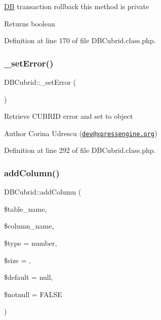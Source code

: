 \hyperlink{classDB}{DB} transaction rollback this method is private \begin{DoxyReturn}{Returns}
boolean 
\end{DoxyReturn}


Definition at line 170 of file D\+B\+Cubrid.\+class.\+php.

\mbox{\label{classDBCubrid_aaf7dd65f4cdfea9903ab641163058936}} 
\subsubsection{\texorpdfstring{\+\_\+set\+Error()}{\_setError()}}
{\footnotesize\ttfamily D\+B\+Cubrid\+::\+\_\+set\+Error (\begin{DoxyParamCaption}{ }\end{DoxyParamCaption})}

Retrieve C\+U\+B\+R\+ID error and set to object

\begin{DoxyAuthor}{Author}
Corina Udrescu (\href{mailto:dev@xpressengine.org}{\tt dev@xpressengine.\+org}) 
\end{DoxyAuthor}


Definition at line 292 of file D\+B\+Cubrid.\+class.\+php.

\mbox{\label{classDBCubrid_aa07f325f6dffa352fa41ea767816e9c1}} 
\subsubsection{\texorpdfstring{add\+Column()}{addColumn()}}
{\footnotesize\ttfamily D\+B\+Cubrid\+::add\+Column (\begin{DoxyParamCaption}\item[{}]{\$table\+\_\+name,  }\item[{}]{\$column\+\_\+name,  }\item[{}]{\$type = {\ttfamily \textquotesingle{}number\textquotesingle{}},  }\item[{}]{\$size = {\ttfamily \textquotesingle{}\textquotesingle{}},  }\item[{}]{\$default = {\ttfamily null},  }\item[{}]{\$notnull = {\ttfamily FALSE} }\end{DoxyParamCaption})}


